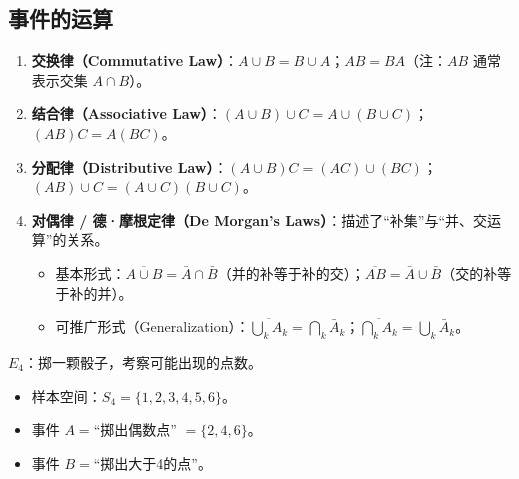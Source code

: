 \subsection{事件的运算}
\begin{property}[事件运算的运算律]
\begin{enumerate}
	\item \textbf{交换律（Commutative Law）}：$A \cup B = B \cup A$；$AB = BA$（注：$AB$ 通常表示交集 $A \cap B$）。
	\item \textbf{结合律（Associative Law）}：$(A \cup B) \cup C = A \cup (B \cup C)$；$(AB)C = A(BC)$。
	\item \textbf{分配律（Distributive Law）}：$(A \cup B)C = (AC) \cup (BC)$；$(AB) \cup C = (A \cup C)(B \cup C)$。
	\item \textbf{对偶律 / 德·摩根定律（De Morgan's Laws）}：描述了“补集”与“并、交运算”的关系。
	\begin{itemize}
		\item 基本形式：$\overline{A \cup B} = \bar{A} \cap \bar{B}$（并的补等于补的交）；$\overline{AB} = \bar{A} \cup \bar{B}$（交的补等于补的并）。
		\item 可推广形式（Generalization）：$\overline{\bigcup_{k} A_k} = \bigcap_{k} \bar{A}_k$；$\overline{\bigcap_{k} A_k} = \bigcup_{k} \bar{A}_k$。
	\end{itemize}
\end{enumerate}
\end{property}

\begin{example}[掷骰子]
$E_4$：掷一颗骰子，考察可能出现的点数。
\begin{itemize}
	\item 样本空间：$S_4 = \{1, 2, 3, 4, 5, 6\}$。
	\item 事件 $A =$“掷出偶数点” $= \{2, 4, 6\}$。
	\item 事件 $B =$“掷出大于4的点”。
\end{itemize}
\end{example}

